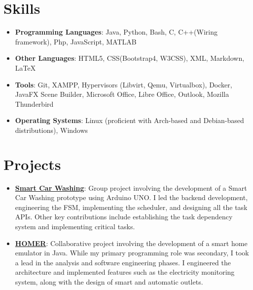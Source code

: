 \documentclass[letterpaper,11pt]{article}
\newcommand{\resumeItem}[2]{
  \item\small{
    \textbf{#1}{: #2 \vspace{-2pt}}
  }
}
\newcommand{\resumeSubItem}[2]{\resumeItem{#1}{#2}\vspace{-4pt}}
\newcommand{\resumeSubHeadingListStart}{\begin{itemize}[leftmargin=*]}
\newcommand{\resumeSubHeadingListEnd}{\end{itemize}}
\begin{document}
\section{Skills}
 \resumeSubHeadingListStart
   \item{
     \textbf{Programming Languages}{: Java, Python, Bash, C, C++(Wiring framework), Php, JavaScript, MATLAB}
     \hfill
     }
     \item{
     \textbf{Other Languages}{: HTML5, CSS(Bootstrap4, W3CSS), XML, Markdown, LaTeX}
     \hfill
     }
     \item{
     \textbf{Tools}{: Git, XAMPP, Hypervisors (Libvirt, Qemu, Virtualbox), Docker, JavaFX Scene Builder, Microsoft Office, Libre Office, Outlook, Mozilla Thunderbird}
     \hfill
     }
     \item{
     \textbf{Operating Systems}{: Linux (proficient with Arch-based and Debian-based distributions), Windows}
     }
 \resumeSubHeadingListEnd
\section{Projects}
  \resumeSubHeadingListStart
    \resumeSubItem{\href{https://github.com/aleemont1/esiot-23-24-assignment2/}{Smart Car Washing}}
      {Group project involving the development of a Smart Car Washing prototype using Arduino UNO. 
      I led the backend development, engineering the FSM, implementing the scheduler, and designing all the task APIs. 
      Other key contributions include establishing the task dependency system and implementing critical tasks.}
    \resumeSubItem{\href{https://github.com/progetto-oop-22-23/OOP22-HOMER}{HOMER}}
      {Collaborative project involving the development of a smart home emulator in Java. 
        While my primary programming role was secondary, I took a lead in the analysis and software engineering phases. 
        I engineered the architecture and implemented features such as the electricity monitoring system, 
        along with the design of smart and automatic outlets.}
  \resumeSubHeadingListEnd
\end{document}
